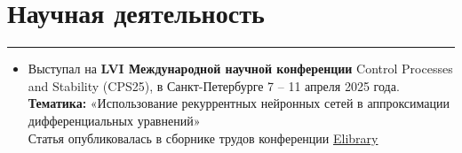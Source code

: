 \documentclass[a4paper,14pt]{article}
\begin{document}
\section*{Научная деятельность}
\hrule
\vspace{0.5em}
\begin{itemize}
    \item Выступал на \textbf{LVI Международной научной конференции} Control Processes and Stability (CPS25), в Санкт-Петербурге 7 – 11 апреля 2025 года. \\
    \textbf{Тематика:} «Использование рекуррентных нейронных сетей в аппроксимации дифференциальных уравнений»\\
    Статья опубликовалась в сборнике трудов конференции \href{https://www.elibrary.ru/item.asp?id=82486855}{Elibrary}
\end{itemize}

%


%
%
\end{document}
